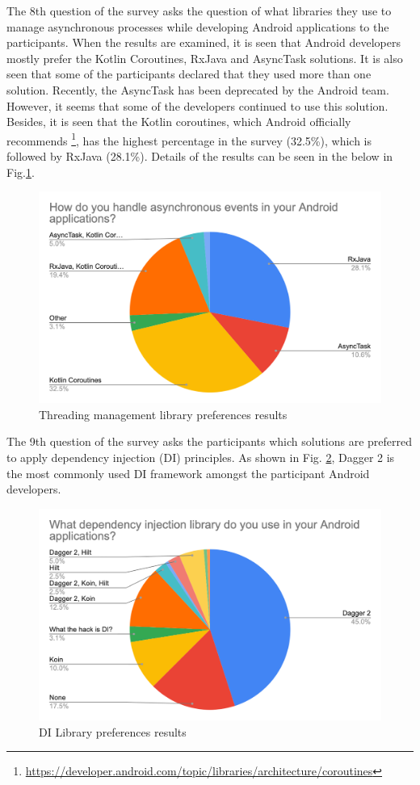 The 8th question of the survey asks the question of what libraries they use to manage asynchronous processes while developing Android applications to the participants. When the results are examined, it is seen that Android developers mostly prefer the Kotlin Coroutines, RxJava and AsyncTask solutions. It is also seen that some of the participants declared that they used more than one solution. Recently, the AsyncTask has been deprecated by the Android team. However, it seems that some of the developers continued to use this solution. Besides, it is seen that the Kotlin coroutines, which Android officially recommends \footnote{\url{https://developer.android.com/topic/libraries/architecture/coroutines}}, has the highest percentage in the survey (32.5\%), which is followed by RxJava (28.1\%). Details of the results can be seen in the below in Fig.\ref{fig:async_events}.
\begin{figure}[ht!]
    \centering
    \includegraphics[scale=0.25]{figures/async_events.png}
    \caption{Threading management library preferences results}
    \label{fig:async_events}
\end{figure}
\FloatBarrier

The 9th question of the survey asks the participants which solutions are preferred to apply dependency injection (DI) principles. As shown in Fig. \ref{fig:di_lib}, Dagger 2 is the most commonly used DI framework amongst the participant Android developers. 
\begin{figure}[ht!]
    \centering
    \includegraphics[scale=0.27]{figures/di_lib.png}
    \caption{DI Library preferences results}
    \label{fig:di_lib}
\end{figure}
\FloatBarrier

